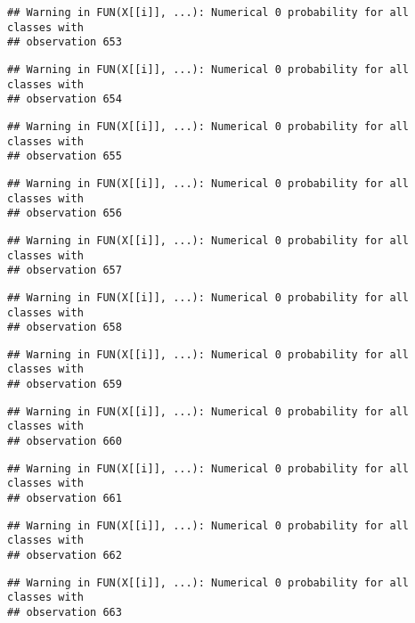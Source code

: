 \documentclass[
]{article}
\begin{document}
\begin{verbatim}
## Warning in FUN(X[[i]], ...): Numerical 0 probability for all classes with
## observation 653
\end{verbatim}

\begin{verbatim}
## Warning in FUN(X[[i]], ...): Numerical 0 probability for all classes with
## observation 654
\end{verbatim}

\begin{verbatim}
## Warning in FUN(X[[i]], ...): Numerical 0 probability for all classes with
## observation 655
\end{verbatim}

\begin{verbatim}
## Warning in FUN(X[[i]], ...): Numerical 0 probability for all classes with
## observation 656
\end{verbatim}

\begin{verbatim}
## Warning in FUN(X[[i]], ...): Numerical 0 probability for all classes with
## observation 657
\end{verbatim}

\begin{verbatim}
## Warning in FUN(X[[i]], ...): Numerical 0 probability for all classes with
## observation 658
\end{verbatim}

\begin{verbatim}
## Warning in FUN(X[[i]], ...): Numerical 0 probability for all classes with
## observation 659
\end{verbatim}

\begin{verbatim}
## Warning in FUN(X[[i]], ...): Numerical 0 probability for all classes with
## observation 660
\end{verbatim}

\begin{verbatim}
## Warning in FUN(X[[i]], ...): Numerical 0 probability for all classes with
## observation 661
\end{verbatim}

\begin{verbatim}
## Warning in FUN(X[[i]], ...): Numerical 0 probability for all classes with
## observation 662
\end{verbatim}

\begin{verbatim}
## Warning in FUN(X[[i]], ...): Numerical 0 probability for all classes with
## observation 663
\end{verbatim}
\end{document}

